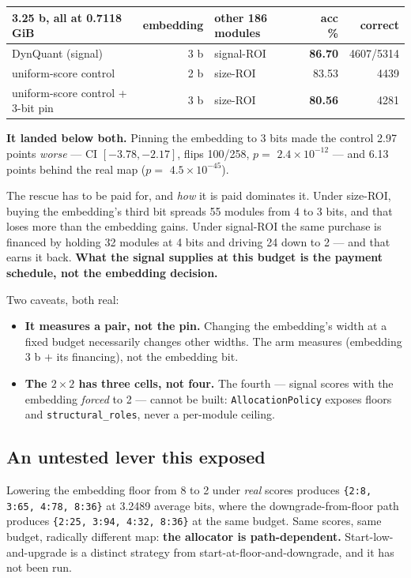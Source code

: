 \documentclass[11pt]{article}
\newcommand{\code}[1]{\texttt{#1}}
\newcommand{\e}[2]{$#1\!\times\!10^{#2}$}
\newcommand{\best}[1]{\textbf{#1}}
\begin{document}
\begin{center}\small
\begin{tabular}{@{}lrlrr@{}}
\toprule
3.25 b, all at 0.7118 GiB & embedding & other 186 modules & acc \% & correct \\
\midrule
DynQuant (signal) & 3 b & signal-ROI & \best{86.70} & 4607/5314 \\
uniform-score control & 2 b & size-ROI & 83.53 & 4439 \\
uniform-score control + 3-bit pin & 3 b & size-ROI & \best{80.56} & 4281 \\
\bottomrule
\end{tabular}
\end{center}

\textbf{It landed below both.} Pinning the embedding to 3 bits made the control 2.97 points
\emph{worse} --- CI $[-3.78, -2.17]$, flips 100/258, $p = $ \e{2.4}{-12} --- and 6.13 points
behind the real map ($p = $ \e{4.5}{-45}).

The rescue has to be paid for, and \emph{how} it is paid dominates it. Under size-ROI, buying the
embedding's third bit spreads 55 modules from 4 to 3 bits, and that loses more than the embedding
gains. Under signal-ROI the same purchase is financed by holding 32 modules at 4 bits and driving
24 down to 2 --- and that earns it back. \textbf{What the signal supplies at this budget is the
payment schedule, not the embedding decision.}

Two caveats, both real:
\begin{itemize}[leftmargin=1.4em]
\item \textbf{It measures a pair, not the pin.} Changing the embedding's width at a fixed budget
necessarily changes other widths. The arm measures (embedding 3 b $+$ its financing), not the
embedding bit.
\item \textbf{The $2\times2$ has three cells, not four.} The fourth --- signal scores with the
embedding \emph{forced} to 2 --- cannot be built: \code{AllocationPolicy} exposes floors and
\code{structural\_roles}, never a per-module ceiling.
\end{itemize}

\subsection{An untested lever this exposed}

Lowering the embedding floor from 8 to 2 under \emph{real} scores produces
\code{\{2:8, 3:65, 4:78, 8:36\}} at 3.2489 average bits, where the downgrade-from-floor path
produces \code{\{2:25, 3:94, 4:32, 8:36\}} at the same budget. Same scores, same budget,
radically different map: \textbf{the allocator is path-dependent.} Start-low-and-upgrade is a
distinct strategy from start-at-floor-and-downgrade, and it has not been run.
\end{document}
